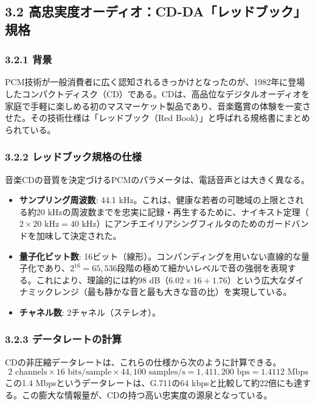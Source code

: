 \documentclass[
  a4paper,  %
  11pt,     %
]{ltjsarticle}%
\begin{document}
\subsection{3.2 高忠実度オーディオ：CD-DA「レッドブック」規格}

\subsubsection{3.2.1 背景}

PCM技術が一般消費者に広く認知されるきっかけとなったのが、1982年に登場したコンパクトディスク（CD）である。CDは、高品位なデジタルオーディオを家庭で手軽に楽しめる初のマスマーケット製品であり、音楽鑑賞の体験を一変させた。その技術仕様は「レッドブック（Red Book）」と呼ばれる規格書にまとめられている。

\subsubsection{3.2.2 レッドブック規格の仕様}

音楽CDの音質を決定づけるPCMのパラメータは、電話音声とは大きく異なる\cite{ref9}。
\begin{itemize}
    \item \textbf{サンプリング周波数}: 44.1 kHz。これは、健康な若者の可聴域の上限とされる約20 kHzの周波数までを忠実に記録・再生するために、ナイキスト定理（$2 \times 20 \text{ kHz} = 40 \text{ kHz}$）にアンチエイリアシングフィルタのためのガードバンドを加味して決定された。
    \item \textbf{量子化ビット数}: 16ビット（線形）。コンパンディングを用いない直線的な量子化であり、$2^{16}=65,536$段階の極めて細かいレベルで音の強弱を表現する。これにより、理論的には約98 dB（$6.02 \times 16 + 1.76$）という広大なダイナミックレンジ（最も静かな音と最も大きな音の比）を実現している。
    \item \textbf{チャネル数}: 2チャネル（ステレオ）。
\end{itemize}

\subsubsection{3.2.3 データレートの計算}

CDの非圧縮データレートは、これらの仕様から次のように計算できる\cite{ref9}。
\begin{equation}
  2 \text{ channels} \times 16 \text{ bits/sample} \times 44,100 \text{ samples/s} = 1,411,200 \text{ bps} = 1.4112 \text{ Mbps}
\end{equation}
この1.4 Mbpsというデータレートは、G.711の64 kbpsと比較して約22倍にも達する。この膨大な情報量が、CDの持つ高い忠実度の源泉となっている。
\end{document}
